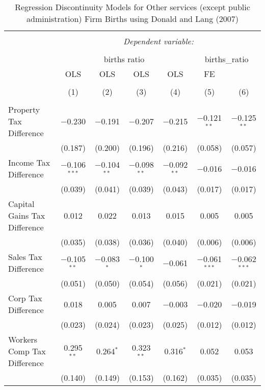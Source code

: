 
\begin{table}[!htbp] \centering 
  \caption{Regression Discontinuity Models for  Other services (except public administration) Firm Births using Donald and Lang (2007)} 
  \label{} 
\begin{tabular}{@{\extracolsep{5pt}}lcccccc} 
\\[-1.8ex]\hline 
\hline \\[-1.8ex] 
 & \multicolumn{6}{c}{\textit{Dependent variable:}} \\ 
\cline{2-7} 
\\[-1.8ex] & \multicolumn{4}{c}{births ratio} & \multicolumn{2}{c}{births\_ratio} \\ 
 & OLS & OLS & OLS & OLS & FE &  \\ 
\\[-1.8ex] & (1) & (2) & (3) & (4) & (5) & (6)\\ 
\hline \\[-1.8ex] 
 Property Tax Difference & $-$0.230 & $-$0.191 & $-$0.207 & $-$0.215 & $-$0.121$^{**}$ & $-$0.125$^{**}$ \\ 
  & (0.187) & (0.200) & (0.196) & (0.216) & (0.058) & (0.057) \\ 
  Income Tax Difference & $-$0.106$^{***}$ & $-$0.104$^{**}$ & $-$0.098$^{**}$ & $-$0.092$^{**}$ & $-$0.016 & $-$0.016 \\ 
  & (0.039) & (0.041) & (0.039) & (0.043) & (0.017) & (0.017) \\ 
  Capital Gains Tax Difference & 0.012 & 0.022 & 0.013 & 0.015 & 0.005 & 0.005 \\ 
  & (0.035) & (0.038) & (0.036) & (0.040) & (0.006) & (0.006) \\ 
  Sales Tax Difference & $-$0.105$^{**}$ & $-$0.083$^{*}$ & $-$0.100$^{*}$ & $-$0.061 & $-$0.061$^{***}$ & $-$0.062$^{***}$ \\ 
  & (0.051) & (0.050) & (0.054) & (0.056) & (0.021) & (0.021) \\ 
  Corp Tax Difference & 0.018 & 0.005 & 0.007 & $-$0.003 & $-$0.020 & $-$0.019 \\ 
  & (0.023) & (0.024) & (0.023) & (0.025) & (0.012) & (0.012) \\ 
  Workers Comp Tax Difference & 0.295$^{**}$ & 0.264$^{*}$ & 0.323$^{**}$ & 0.316$^{*}$ & 0.052 & 0.053 \\ 
  & (0.140) & (0.149) & (0.153) & (0.162) & (0.035) & (0.035) \\ 

\end{tabular}
\end{table}
